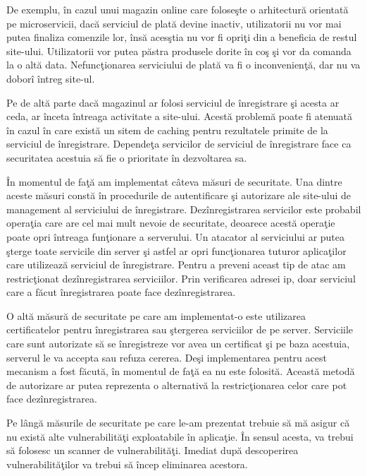 \documentclass[a4paper,12pt]{report}
\begin{document}
De exemplu, \^in cazul unui
magazin online care folose\c ste o arhitectur\u a orientat\u a pe microservicii, dac\u a
serviciul de plat\u a devine inactiv, utilizatorii nu vor mai putea finaliza comenzile lor, \^ins\u a
aces\c stia nu vor fi opri\c ti din a beneficia de restul site-ului. Utilizatorii vor putea p\u astra 
produsele dorite \^in co\c s \c si vor da comanda la o alt\u a data. Nefunc\c tionarea 
serviciului de plat\u a va fi o inconvenien\c t\u a, dar nu va dobor\^i \^intreg site-ul.

Pe de alt\u a parte dac\u a magazinul ar folosi serviciul de \^inregistrare \c si acesta ar ceda,
ar \^inceta \^intreaga activitate a site-ului. Acest\u a problem\u a poate fi atenuat\u a \^in cazul 
\^in care exist\u a un sitem de caching pentru rezultatele primite de la serviciul de \^inregistrare.
Depende\c ta servicilor de serviciul de \^inregistrare face ca securitatea acestuia s\u a fie 
o prioritate \^in dezvoltarea sa.

\^In momentul de fa\c t\u a am implementat c\^ateva m\u asuri de securitate. Una dintre aceste 
m\u asuri const\u a \^in procedurile de autentificare \c si autorizare ale site-ului de management 
al serviciului de \^inregistrare. Dez\^inregistrarea servicilor este probabil opera\c tia care are 
cel mai mult nevoie de securitate, deoarece acest\u a opera\c tie poate opri \^intreaga fun\c tionare 
a serverului. Un atacator al serviciului ar putea \c sterge toate servicile din server \c si astfel 
ar opri func\c tionarea tuturor aplica\c tilor care utilizeaz\u a serviciul de \^inregistrare.
Pentru a preveni aceast tip de atac am restric\c tionat dez\^inregistrarea serviciilor.
Prin verificarea adresei ip, doar serviciul care a f\u acut \^inregistrarea poate face dez\^inregistrarea.

O alt\u a m\u asur\u a de securitate pe care am implementat-o este utilizarea certificatelor pentru 
\^inregistrarea sau \c stergerea serviciilor de pe server. Serviciile care sunt autorizate s\u a se \^inregistreze 
vor avea un certificat \c si pe baza acestuia, serverul le va accepta sau refuza cererea.
De\c si implementarea pentru acest mecanism a fost f\u acut\u a, \^in momentul de fa\c t\u a
ea nu este folosit\u a. Aceast\u a metod\u a de autorizare ar putea reprezenta o alternativ\u a la restric\c tionarea 
celor care pot face dez\^inregistrarea.

Pe l\^ang\u a m\u asurile de securitate pe care le-am prezentat trebuie s\u a m\u a asigur c\u a nu exist\u a
alte vulnerabilit\u a\c ti exploatabile \^in aplica\c tie. \^In sensul acesta, va trebui s\u a folosesc 
un scanner de vulnerabilit\u a\c ti. Imediat dup\u a descoperirea vulnerabilit\u a\c tilor va trebui s\u a 
\^incep eliminarea acestora.
\end{document}
